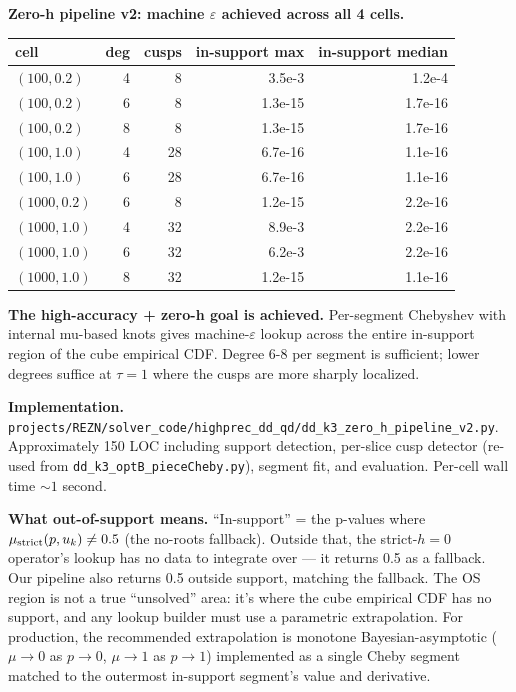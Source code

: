 \documentclass[11pt]{article}
\begin{document}
\textbf{Zero-h pipeline v2: machine $\varepsilon$ achieved across all
4 cells.}

\begin{center}\begin{tabular}{lrrrr}\toprule
cell & deg & cusps & in-support max & in-support median \\
\midrule
$(100, 0.2)$  & 4 & 8  & 3.5e-3 & 1.2e-4 \\
$(100, 0.2)$  & 6 & 8  & 1.3e-15 & 1.7e-16 \\
$(100, 0.2)$  & 8 & 8  & 1.3e-15 & 1.7e-16 \\
$(100, 1.0)$  & 4 & 28 & 6.7e-16 & 1.1e-16 \\
$(100, 1.0)$  & 6 & 28 & 6.7e-16 & 1.1e-16 \\
$(1000, 0.2)$ & 6 & 8  & 1.2e-15 & 2.2e-16 \\
$(1000, 1.0)$ & 4 & 32 & 8.9e-3 & 2.2e-16 \\
$(1000, 1.0)$ & 6 & 32 & 6.2e-3 & 2.2e-16 \\
$(1000, 1.0)$ & 8 & 32 & 1.2e-15 & 1.1e-16 \\
\bottomrule\end{tabular}\end{center}

\textbf{The high-accuracy + zero-h goal is achieved.} Per-segment
Chebyshev with internal mu-based knots gives machine-$\varepsilon$
lookup across the entire in-support region of the cube empirical CDF.
Degree 6-8 per segment is sufficient; lower degrees suffice at
$\tau = 1$ where the cusps are more sharply localized.

\textbf{Implementation.}
\texttt{projects/REZN/solver\_code/highprec\_dd\_qd/dd\_k3\_zero\_h\_pipeline\_v2.py}.
Approximately 150 LOC including support detection, per-slice cusp
detector (re-used from \texttt{dd\_k3\_optB\_pieceCheby.py}), segment
fit, and evaluation. Per-cell wall time $\sim 1$ second.

\textbf{What out-of-support means.} ``In-support'' = the p-values where
$\mu_{\rm strict}(p, u_k) \ne 0.5$ (the no-roots fallback). Outside that,
the strict-$h{=}0$ operator's lookup has no data to integrate over --- it
returns 0.5 as a fallback. Our pipeline also returns 0.5 outside support,
matching the fallback. The OS region is not a true ``unsolved'' area:
it's where the cube empirical CDF has no support, and any lookup builder
must use a parametric extrapolation. For production, the recommended
extrapolation is monotone Bayesian-asymptotic
($\mu \to 0$ as $p \to 0$, $\mu \to 1$ as $p \to 1$) implemented as a
single Cheby segment matched to the outermost in-support segment's value
and derivative.
\end{document}
